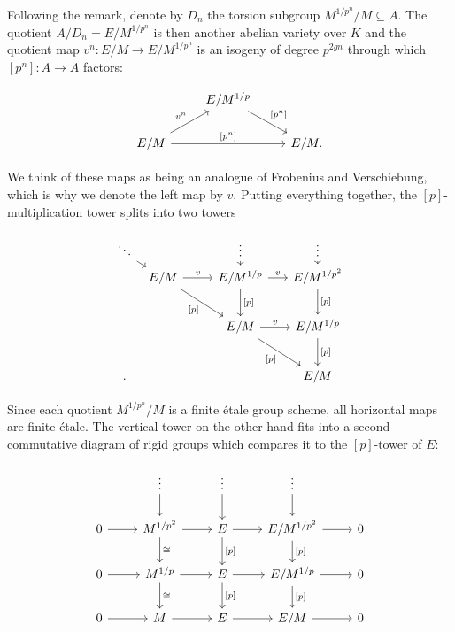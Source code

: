 \documentclass[10pt,oneside]{amsart}
\theoremstyle{definition}
\begin{document}
	Following the remark, denote by $D_n$ the torsion subgroup $M^{1/p^n}/M\subseteq A$. The quotient $A/D_n = E/M^{1/p^n}$ is then another abelian variety over $K$ and the quotient map $v^n:E/M\rightarrow E/M^{1/p^n}$ is an isogeny of degree $p^{2gn}$  through which  $[p^n]:A\rightarrow A$ factors: 
		\begin{center}
			\begin{equation}\label{factorisation of [p] over E/M}
			\begin{tikzcd}
				& E/M^{1/p} \arrow[rd, "{[p^n]}"] &  \\
				E/M \arrow[rr, "{[p^n]}"] \arrow[ru,"v^n"] &  & E/M.
			\end{tikzcd}
			\end{equation}
		\end{center}
		We think of these maps as being an analogue of Frobenius and Verschiebung, which is why we denote the left map by $v$.
		Putting everything together, the $[p]$-multiplication tower splits into two towers
		\begin{center}
		\begin{equation}\label{p-multiplication tower of E/M splits into vertical and horizontal tower}
		\begin{tikzcd}[column sep={1.1cm,between origins},row sep={0.7cm,between origins}]
			\ddots \arrow[rd] &  &  & \vdots \arrow[d] &  & \vdots \arrow[d] \\
			& E/M \arrow[rr,"v"] \arrow[rrdd, "{[p]}"'] &  & E/M^{1/p} \arrow[rr,"v"] \arrow[dd,"{[p]}"] &  & E/M^{1/p^2} \arrow[dd,"{[p]}"] \\
			&  &  &  &  &  \\
			&  &  & E/M \arrow[rrdd, "{[p]}"'] \arrow[rr,"v"] &  & E/M^{1/p} \arrow[dd,"{[p]}"] \\
			&  &  &  &  &  \\.
			&  &  &  &  & E/M
		\end{tikzcd}
		\end{equation}
		\end{center}
		Since each quotient $M^{1/p^n}/M$ is a finite \'etale group scheme, all horizontal maps are finite \'etale. The vertical tower on the other hand fits into a second commutative diagram of rigid groups which compares it to the $[p]$-tower of $E$:
		
		\begin{center}
		\begin{equation}\label{F-tower for E/M}
		\begin{tikzcd}
			& \vdots \arrow[d] & \vdots \arrow[d] & \vdots \arrow[d] &  \\
			0 \arrow[r] & M^{1/p^2} \arrow[d, "\cong"] \arrow[r] & E \arrow[d, "{[p]}"] \arrow[r] & E/M^{1/p^2} \arrow[d, "{[p]}"] \arrow[r] & 0 \\
			0 \arrow[r] & M^{1/p} \arrow[d, "\cong"] \arrow[r] & E \arrow[d, "{[p]}"] \arrow[r] & E/M^{1/p} \arrow[d, "{[p]}"] \arrow[r] & 0 \\
			0 \arrow[r] & M \arrow[r] & E \arrow[r] & E/M \arrow[r] & 0
		\end{tikzcd}
		\end{equation}
		\end{center}
		
\end{document}
